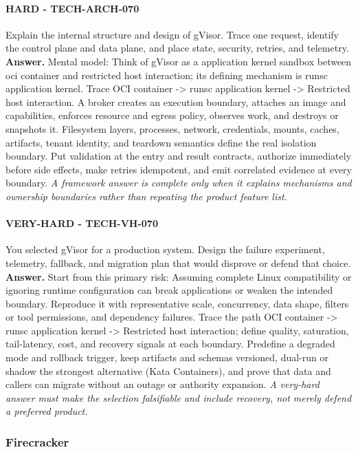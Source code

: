 \paragraph{HARD - TECH-ARCH-070} Explain the internal structure and design of gVisor. Trace one request, identify the control plane and data plane, and place state, security, retries, and telemetry.
\textbf{Answer.} Mental model: Think of gVisor as a application kernel sandbox between oci container and restricted host interaction; its defining mechanism is runsc application kernel. Trace OCI container -> runsc application kernel -> Restricted host interaction. A broker creates an execution boundary, attaches an image and capabilities, enforces resource and egress policy, observes work, and destroys or snapshots it. Filesystem layers, processes, network, credentials, mounts, caches, artifacts, tenant identity, and teardown semantics define the real isolation boundary. Put validation at the entry and result contracts, authorize immediately before side effects, make retries idempotent, and emit correlated evidence at every boundary.
\textit{A framework answer is complete only when it explains mechanisms and ownership boundaries rather than repeating the product feature list.}
\paragraph{VERY-HARD - TECH-VH-070} You selected gVisor for a production system. Design the failure experiment, telemetry, fallback, and migration plan that would disprove or defend that choice.
\textbf{Answer.} Start from this primary risk: Assuming complete Linux compatibility or ignoring runtime configuration can break applications or weaken the intended boundary. Reproduce it with representative scale, concurrency, data shape, filters or tool permissions, and dependency failures. Trace the path OCI container -> runsc application kernel -> Restricted host interaction; define quality, saturation, tail-latency, cost, and recovery signals at each boundary. Predefine a degraded mode and rollback trigger, keep artifacts and schemas versioned, dual-run or shadow the strongest alternative (Kata Containers), and prove that data and callers can migrate without an outage or authority expansion.
\textit{A very-hard answer must make the selection falsifiable and include recovery, not merely defend a preferred product.}
\subsubsection*{Firecracker}
